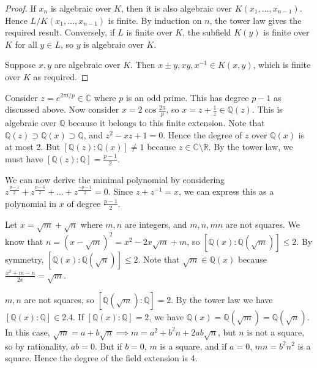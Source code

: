 \begin{proof}
	If \( x_n \) is algebraic over \( K \), then it is also algebraic over \( K(x_1, \dots, x_{n-1}) \).
	Hence \( L / K(x_1, \dots, x_{n-1}) \) is finite.
	By induction on \( n \), the tower law gives the required result.
	Conversely, if \( L \) is finite over \( K \), the subfield \( K(y) \) is finite over \( K \) for all \( y \in L \), so \( y \) is algebraic over \( K \).

	Suppose \( x, y \) are algebraic over \( K \).
	Then \( x \pm y, xy, x^{-1} \in K(x,y) \), which is finite over \( K \) as required.
\end{proof}
\begin{example}
	Consider \( z = e^{2\pi i/p} \in \mathbb C \) where \( p \) is an odd prime.
	This has degree \( p - 1 \) as discussed above.
	Now consider \( x = 2\cos \frac{2\pi}{p} \), so \( x = z + \frac 1z \in \mathbb Q(z) \).
	This is algebraic over \( \mathbb Q \) because it belongs to this finite extension.
	Note that \( \mathbb Q(z) \supset \mathbb Q(x) \supset \mathbb Q \), and \( z^2 - xz + 1 = 0 \).
	Hence the degree of \( z \) over \( \mathbb Q(x) \) is at most 2.
	But \( [\mathbb Q(z):\mathbb Q(x)] \neq 1 \) because \( z \in \mathbb C \setminus \mathbb R \).
	By the tower law, we must have \( [\mathbb Q(z):\mathbb Q] = \frac{p-1}{2} \).

	We can now derive the minimal polynomial by considering \( z^{\frac{p-1}{2}} + z^{\frac{p-3}{2}} + \dots + z^{\frac{-p-1}{2}} = 0 \).
	Since \( z + z^{-1} = x \), we can express this as a polynomial in \( x \) of degree \( \frac{p-1}{2} \).
\end{example}
\begin{example}
	Let \( x = \sqrt m + \sqrt n \) where \( m, n \) are integers, and \( m, n, mn \) are not squares.
	We know that \( n = (x-\sqrt m)^2 = x^2 - 2x\sqrt m + m \), so \( [\mathbb Q(x):\mathbb Q(\sqrt m)] \leq 2 \).
	By symmetry, \( [\mathbb Q(x):\mathbb Q(\sqrt n)] \leq 2 \).
	Note that \( \sqrt m \in \mathbb Q(x) \) because \( \frac{x^2 + m - n}{2x} = \sqrt m \).

	\( m, n \) are not squares, so \( [\mathbb Q(\sqrt m):\mathbb Q] = 2 \).
	By the tower law we have \( [\mathbb Q(x):\mathbb Q] \in \qty{2,4} \).
	If \( [\mathbb Q(x):\mathbb Q] = 2 \), we have \( \mathbb Q(x) = \mathbb Q(\sqrt m) = \mathbb Q(\sqrt n) \).
	In this case, \( \sqrt m = a + b \sqrt n \implies m = a^2 + b^2 n + 2ab \sqrt n \), but \( n \) is not a square, so by rationality, \( ab = 0 \).
	But if \( b = 0 \), \( m \) is a square, and if \( a = 0 \), \( mn = b^2 n^2 \) is a square.
	Hence the degree of the field extension is 4.
\end{example}
